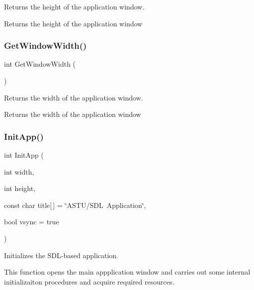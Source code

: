 Returns the height of the application window.

\begin{DoxyReturn}{Returns}
the height of the application window 
\end{DoxyReturn}
\mbox{\label{group__sdl__group_gaa938d3f784d26ccd4ed8c2d83bbc6ab4}} 
\subsubsection{\texorpdfstring{Get\+Window\+Width()}{GetWindowWidth()}}
{\footnotesize\ttfamily int Get\+Window\+Width (\begin{DoxyParamCaption}{ }\end{DoxyParamCaption})}

Returns the width of the application window.

\begin{DoxyReturn}{Returns}
the width of the application window 
\end{DoxyReturn}
\mbox{\label{group__sdl__group_ga8f43e7993cf196bb0af33a60bc93aa75}} 
\subsubsection{\texorpdfstring{Init\+App()}{InitApp()}}
{\footnotesize\ttfamily int Init\+App (\begin{DoxyParamCaption}\item[{int}]{width,  }\item[{int}]{height,  }\item[{const char}]{title\mbox{[}$\,$\mbox{]} = {\ttfamily \char`\"{}ASTU/SDL~Application\char`\"{}},  }\item[{bool}]{vsync = {\ttfamily true} }\end{DoxyParamCaption})}

Initializes the S\+D\+L-\/based application.

This function opens the main appplication window and carries out some internal initializaiton procedures and acquire required resources.


